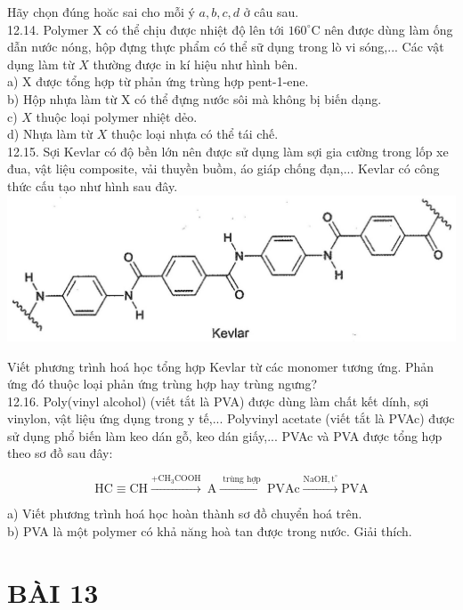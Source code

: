 \documentclass[10pt]{article}
\begin{document}
Hãy chọn đúng hoăc sai cho mỗi ý $a, b, c, d$ ở câu sau.\\
12.14. Polymer X có thể chịu được nhiệt độ lên tới $160^{\circ} \mathrm{C}$ nên được dùng làm ống dẫn nước nóng, hộp đựng thực phẩm có thể sữ dụng trong lò vi sóng,... Các vật dụng làm từ $X$ thường được in kí hiệu như hình bên.\\
a) X được tổng hợp từ phản ứng trùng hợp pent-1-ene.\\
b) Hộp nhựa làm từ X có thể đựng nước sôi mà không bị biến dạng.\\
c) $X$ thuộc loại polymer nhiệt dẻo.\\
d) Nhựa làm từ $X$ thuộc loại nhựa có thể tái chế.\\
12.15. Sợi Kevlar có độ bền lớn nên được sử dụng làm sợi gia cường trong lốp xe đua, vật liệu composite, vải thuyền buồm, áo giáp chống đạn,... Kevlar có công thức cấu tạo như hình sau đây.\\
\includegraphics[max width=\textwidth, center]{2025_10_23_74efce88ce3a451fd6b0g-037}

Viết phương trình hoá học tổng hợp Kevlar từ các monomer tương ứng. Phản ứng đó thuộc loại phản ứng trùng hợp hay trùng ngưng?\\
12.16. Poly(vinyl alcohol) (viết tắt là PVA) được dùng làm chất kết dính, sợi vinylon, vật liệu ứng dụng trong y tế,... Polyvinyl acetate (viết tắt là PVAc) được sử dụng phổ biến làm keo dán gỗ, keo dán giấy,... PVAc và PVA được tổng hợp theo sơ đồ sau đây:

$$
\mathrm{HC} \equiv \mathrm{CH} \xrightarrow{+\mathrm{CH}_{3} \mathrm{COOH}} \mathrm{~A} \xrightarrow{\text { trùng hợp }} \mathrm{PVAc} \xrightarrow{\mathrm{NaOH}, \mathrm{t}^{\circ}} \mathrm{PVA}
$$

a) Viết phương trình hoá học hoàn thành sơ đồ chuyển hoá trên.\\
b) PVA là một polymer có khả năng hoà tan được trong nước. Giải thích.

\section*{BÀI 13}
\end{document}
